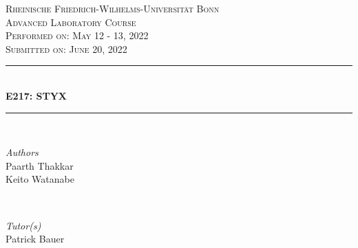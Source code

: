 \documentclass[a4paper]{report}
\numberwithin{equation}{section}
\begin{document}
\begin{titlepage} %
	\newcommand{\HRule}{\rule{\linewidth}{0.5mm}} %
	
	\center %
	
	\textsc{\LARGE Rheinische Friedrich-Wilhelms-Universit\"at Bonn }\\[4cm] %
	
	\textsc{\Large Advanced Laboratory Course}\\[0.5cm] %
	
	\textsc{\large Performed on: May 12 - 13, 2022}\\[0.5cm] %

	\textsc{\large Submitted on: June 20, 2022}\\[0.5cm] %
	
	
	\HRule\\[0.4cm]
	
	{\huge\bfseries E217: STYX}\\[0.4cm] %
	
	\HRule\\[1.5cm]
	
	
	\begin{minipage}{0.4\textwidth}
		\begin{flushleft}
			\large
			\textit{Authors}\\
			Paarth Thakkar \\
			Keito Watanabe
		\end{flushleft}
	\end{minipage}
	~
	\begin{minipage}{0.4\textwidth}
		\begin{flushright}
			\large
			\textit{Tutor(s)}\\
			Patrick Bauer
		\end{flushright}
	\end{minipage}


\end{titlepage}
\end{document}
